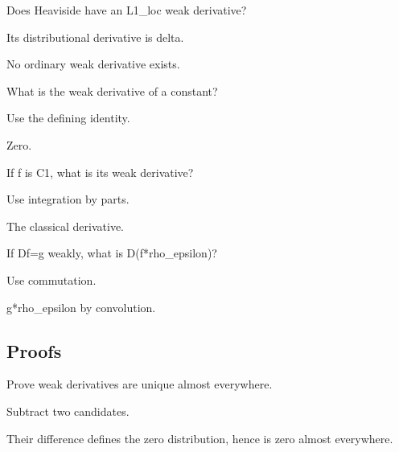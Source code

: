 \begin{exercise}[Heaviside]\label{exr:iii20-expand-02}
Does Heaviside have an L1\_loc weak derivative?
\end{exercise}
\begin{hint}
Its distributional derivative is delta.
\end{hint}
\begin{solution}
No ordinary weak derivative exists.
\end{solution}

\begin{exercise}[Constant]\label{exr:iii20-expand-03}
What is the weak derivative of a constant?
\end{exercise}
\begin{hint}
Use the defining identity.
\end{hint}
\begin{solution}
Zero.
\end{solution}

\begin{exercise}\label{exr:iii20-expand-04}
If f is C1, what is its weak derivative?
\end{exercise}
\begin{hint}
Use integration by parts.
\end{hint}
\begin{solution}
The classical derivative.
\end{solution}

\begin{exercise}\label{exr:iii20-expand-05}
If Df=g weakly, what is D(f*rho\_epsilon)?
\end{exercise}
\begin{hint}
Use commutation.
\end{hint}
\begin{solution}
g*rho\_epsilon by convolution.
\end{solution}

\subsection*{Proofs}

\begin{exercise}[Uniqueness]\label{exr:iii20-expand-06}
Prove weak derivatives are unique almost everywhere.
\end{exercise}
\begin{hint}
Subtract two candidates.
\end{hint}
\begin{solution}
Their difference defines the zero distribution, hence is zero almost everywhere.
\end{solution}

